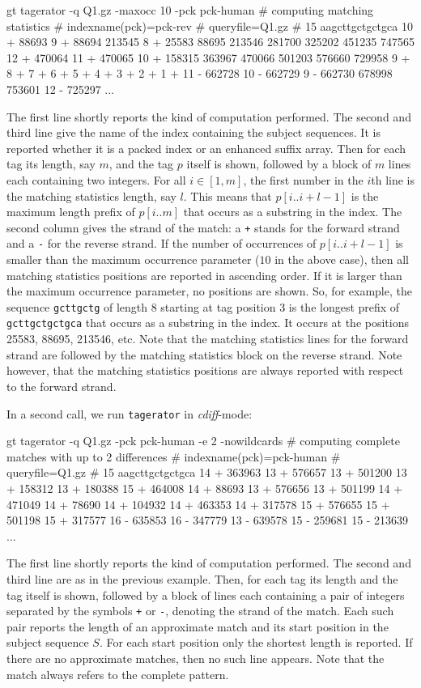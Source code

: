 \documentclass[12pt]{article}
\newcommand{\Substring}[3]{#1[#2..#3]}
\newcommand{\Program}[0]{\texttt{tagerator}\xspace}
\begin{document}
\begin{Output}
gt tagerator -q Q1.gz -maxocc 10 -pck pck-human
# computing matching statistics
# indexname(pck)=pck-rev
# queryfile=Q1.gz
# 15 aagcttgctgctgca
10 + 88693
9 + 88694 213545
8 + 25583 88695 213546 281700 325202 451235 747565
12 + 470064
11 + 470065
10 + 158315 363967 470066 501203 576660 729958
9 +
8 +
7 +
6 +
5 +
4 +
3 +
2 +
1 +
11 - 662728
10 - 662729
9 - 662730 678998 753601
12 - 725297
...
\end{Output}
The first line shortly reports the kind of computation performed. The second
and third line give the name of the index containing the subject sequences.
It is reported whether it is a packed index or an enhanced suffix array. 
Then for
each tag its length, say \(m\), and the tag \(p\) itself is shown, followed by 
a block of \(m\) lines each containing two integers. For all \(i\in[1,m]\), 
the first number in the \(i\)th line is the matching statistics length, say
\(l\). This means that \(\Substring{p}{i}{i+l-1}\) is the maximum length prefix
of \(\Substring{p}{i}{m}\) that occurs as a substring in the index.  The
second column gives the strand of the match: a \texttt{+} stands for the
forward strand and a \texttt{-} for the reverse strand.
If the number of occurrences of \(\Substring{p}{i}{i+l-1}\) is smaller than 
the maximum
occurrence parameter (\(10\) in the above case), then all matching statistics 
positions are reported in ascending order. If it is larger than the maximum
occurrence parameter, no positions are shown.
So, for example, the sequence \texttt{gcttgctg} of length 8 starting at tag
position 3 is the longest prefix of \texttt{gcttgctgctgca} that occurs as 
a substring in the index. It occurs at the positions 25583, 88695, 213546,
etc. Note that the matching statistics lines for the forward strand are
followed by the matching statistics block on the reverse strand. Note however,
that the matching statistics positions are always reported with respect to the
forward strand.

In a second call, we run \Program in \textit{cdiff}-mode:

\begin{Output}
gt tagerator -q Q1.gz -pck pck-human -e 2 -nowildcards
# computing complete matches with up to 2 differences
# indexname(pck)=pck-human
# queryfile=Q1.gz
# 15 aagcttgctgctgca
14 + 363963
13 + 576657
13 + 501200
13 + 158312
13 + 180388
15 + 464008
14 + 88693
13 + 576656
13 + 501199
14 + 471049
14 + 78690
14 + 104932
14 + 463353
14 + 317578
15 + 576655
15 + 501198
15 + 317577
16 - 635853
16 - 347779
13 - 639578
15 - 259681
15 - 213639
...
\end{Output}
The first line shortly reports the kind of computation performed. The second
and third line are as in the previous example. Then, for
each tag its length and the tag itself is shown, followed by 
a block of lines each containing a pair of integers separated by the
symbols \texttt{+} or \texttt{-}, denoting the strand of the match.
Each such pair reports the length of an approximate match and its start 
position in the subject sequence \(S\). For each
start position only the shortest length is reported. If there are no
approximate matches, then no such line appears. Note that the match always
refers to the complete pattern.
\end{document}
